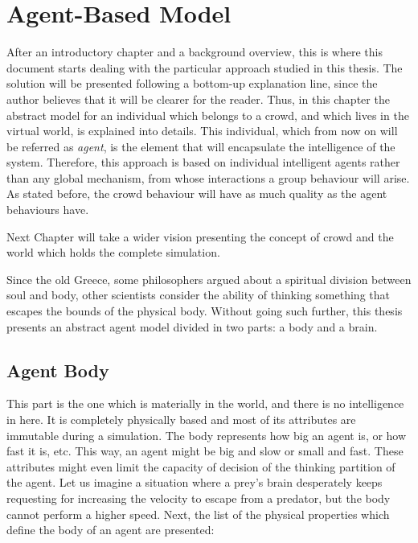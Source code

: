\ifx\isEmbedded\undefined

\graphicspath{{../img/}}

\fi

\chapter{Agent-Based Model}
\label{chap:agent-based model}

After an introductory chapter and a background overview, this is where this document starts dealing with the particular approach studied in this thesis. The solution will be presented following a bottom-up explanation line, since the author believes that it will be clearer for the reader. Thus, in this chapter the abstract model for an individual which belongs to a crowd, and which lives in the virtual world, is explained into details. This individual, which from now on will be referred as \emph{agent}, is the element that will encapsulate the intelligence of the system. Therefore, this approach is based on individual intelligent agents rather than any global mechanism, from whose interactions a group behaviour will arise. As stated before, the crowd behaviour will have as much quality as the agent behaviours have.

Next Chapter will take a wider vision presenting the concept of crowd and the world which holds the complete simulation.

Since the old Greece, some philosophers argued about a spiritual division between soul and body, other scientists consider the ability of thinking something that escapes the bounds of the physical body. Without going such further, this thesis presents an abstract agent model divided in two parts: a body and a brain.

\section{Agent Body}

This part is the one which is materially in the world, and there is no intelligence in here. It is completely physically based and most of its attributes are immutable during a simulation. The body represents how big an agent is, or how fast it is, etc. This way, an agent might be big and slow or small and fast. These attributes might even limit the capacity of decision of the thinking partition of the agent. Let us imagine a situation where a prey's brain desperately keeps requesting for increasing the velocity to escape from a predator, but the body cannot perform a higher speed. Next, the list of the physical properties which define the body of an agent are presented:

